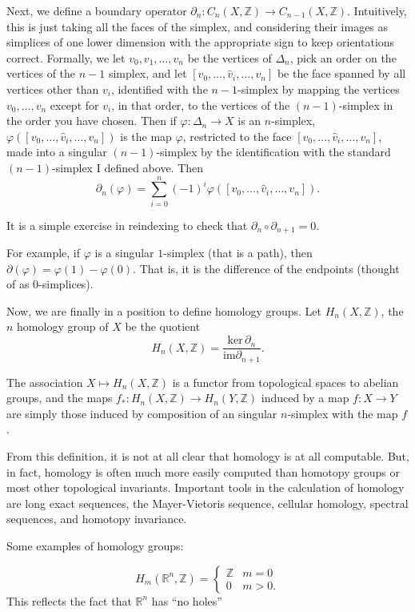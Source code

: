 \documentclass[12pt]{article}
\newcommand{\im}{\mathrm{im}}
\renewcommand{\ker}{\mathrm{ker}\,}
\newcommand{\R}{\mathbb{R}}
\newcommand{\vp}{\varphi}
\newcommand{\Z}{\mathbb{Z}}
\begin{document}
Next, we define a boundary operator $\partial_n:C_n(X,\Z)\to C_{n-1}(X,\Z)$.  Intuitively, this is just taking
all the faces of the simplex, and considering their images as simplices of one lower dimension
with the appropriate sign to keep orientations correct.  Formally, we let $v_0,v_1,\ldots,v_n$
be the vertices of $\Delta_n$, pick an order on the vertices of the $n-1$ simplex, and let 
$[v_0,\ldots,\hat{v}_i,\ldots,v_n]$ be the face spanned by all vertices other than $v_i$, identified
with the $n-1$-simplex by mapping the vertices $v_0,\ldots,v_n$ except for $v_i$, in that order,
to the vertices of the $(n-1)$-simplex in the order you have chosen.
Then if $\vp:\Delta_n\to X$ is an $n$-simplex, $\vp([v_0,\ldots,\hat{v}_i,\ldots,v_n])$ is the map
$\vp$, restricted to the face $[v_0,\ldots,\hat{v}_i,\ldots,v_n]$, made into a singular 
$(n-1)$-simplex by the identification with the standard $(n-1)$-simplex I defined above.
Then 
\[
\partial_n(\vp)=\sum_{i=0}^n(-1)^i\vp([v_0,\ldots,\hat{v}_i,\ldots,v_n]).
\]

It is a simple exercise in reindexing to check that $\partial_n\circ\partial_{n+1}=0$.

For example, if $\vp$ is a singular $1$-simplex (that is a path), then $\partial(\vp)=\vp(1)-\vp(0)$.
That is, it is the difference of the endpoints (thought of as 0-simplices).

Now, we are finally in a position to define homology groups.  Let $H_n(X,\Z)$, the $n$ homology
group of $X$ be the quotient 
\[
H_n(X,\Z)=\frac{\ker \partial_{n}}{\im \partial_{n+1}}.
\]

The association $X\mapsto H_n(X,\Z)$ is a functor from topological spaces to abelian groups, and the maps $f_*:H_n(X,\Z)\to H_n(Y,\Z)$ induced by a map $f:X\to Y$
are simply those induced by composition of an singular $n$-simplex with the map $f$.

From this definition, it is not at all clear that homology is at all computable.  But, in fact, homology is often much more easily computed than homotopy groups or most other topological invariants.  Important tools in the calculation of homology are long exact sequences, the Mayer-Vietoris sequence, cellular homology, spectral sequences, and homotopy invariance.

Some examples of homology groups:

\[
H_m(\R^n,\Z)=
\begin{cases}
\Z	&	m=0\\
0	&	m> 0.
\end{cases}
\]
This reflects the fact that $\R^n$ has ``no holes''
\end{document}
